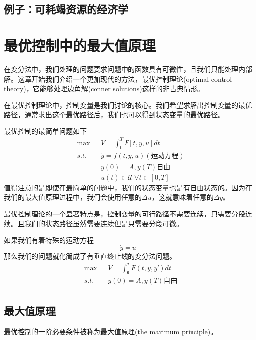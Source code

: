 \documentclass[UTF8,12pt]{ctexart}
\numberwithin{equation}{section} %
\numberwithin{figure}{section}
\numberwithin{table}{section}
\begin{document}
	
	\subsection{例子：可耗竭资源的经济学}
	
	
	
	\newpage
	
	
	\section{最优控制中的最大值原理}
	在变分法中，我们处理的问题要求问题中的函数具有可微性，且我们只能处理内部解。这章开始我们介绍一个更加现代的方法，最优控制理论(optimal control theory)，它能够处理边角解(conner solutions)这样的非古典情形。
	
	在最优控制理论中，控制变量是我们讨论的核心。我们希望求解出控制变量的最优路径，通常求出这个最优路径后，我们也可以得到状态变量的最优路径。
	
	最优控制的最简单问题如下
	\begin{equation}
		\begin{aligned}
			&\max &&V = \int_{0}^{T}F[t,y,u]dt \\
			&s.t. &&\dot{y} = f(t,y,u) (\text{运动方程}) \\
			&  &&y(0) = A,y(T)\text{自由} \\ 
			&  &&u(t) \in \mathscr{U} \ \forall t \in [0,T]
		\end{aligned}
	\end{equation}
	值得注意的是即使在最简单的问题中，我们的状态变量也是有自由状态的。因为在我们的最大值原理过程中，我们会使用任意的$\Delta u$，这就意味着任意的$\Delta y$。
	
	最优控制理论的一个显著特点是，控制变量的可行路径不需要连续，只需要分段连续。且我们的状态路径虽然需要连续但是只需要分段可微。
	
	如果我们有着特殊的运动方程
	\begin{equation}
		\dot{y} = u
	\end{equation}
	那么我们的问题就化简成了有垂直终止线的变分法问题。
	\begin{equation}
		\begin{aligned}
			&\max &&V = \int_{0}^{T}F(t,y,y')dt \\
			&s.t.&&y(0) = A,y(T)\text{自由} \\
		\end{aligned}
	\end{equation}

	\subsection{最大值原理}
	最优控制的一阶必要条件被称为最大值原理(the maximum principle)。
	
\end{document}
